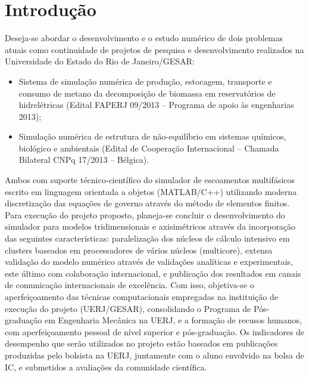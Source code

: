 \documentclass[a4paper,portuges]{article}
\begin{document}
\section{Introdução}
Deseja-se abordar o desenvolvimento e o estudo numérico de dois
problemas atuais como continuidade de projetos de pesquisa e
desenvolvimento realizados na Universidade do Estado do Rio de
Janeiro/GESAR: 

\begin{itemize}
\item Sistema de simulação numérica de produção, estocagem,
transporte e consumo de metano da decomposição de biomassa em
reservatórios de hidrelétricas (Edital FAPERJ 09/2013 – Programa de
apoio às engenharias 2013); 
\item Simulação numérica de estrutura de
não-equilíbrio em sistemas químicos, biológico e ambientais (Edital de
Cooperação Internacional – Chamada Bilateral CNPq 17/2013 – Bélgica).
\end{itemize}

Ambos com suporte técnico-científico do simulador de escoamentos
multifásicos escrito em linguagem orientada a objetos (MATLAB/C++)
utilizando moderna discretização das equações de governo através do
método de elementos finitos. Para execução do projeto proposto,
planeja-se concluir o desenvolvimento do simulador para modelos
tridimensionais e axisimétricos através da incorporação das seguintes
características: paralelização dos núcleos de cálculo intensivo em
clusters baseados em processadores de vários núcleos (multicore),
extensa validação do modelo numérico através de validações analíticas e
experimentais, este último com colaboração internacional, e publicação
dos resultados em canais de comunicação internacionais de excelência.
Com isso, objetiva-se o aperfeiçoamento das técnicas computacionais
empregadas na instituição de execução do projeto (UERJ/GESAR),
consolidando o Programa de Pós-graduação em Engenharia Mecânica na UERJ,
e a formação de recusos humanos, com aperfeiçoamento pessoal de nível
superior e pós-graduação. Os indicadores de desempenho que serão
utilizados no projeto estão baseados em publicações produzidas pelo
bolsista na UERJ, juntamente com o aluno envolvido na bolsa de IC, e
submetidos a avaliações da comunidade científica.
\end{document}
